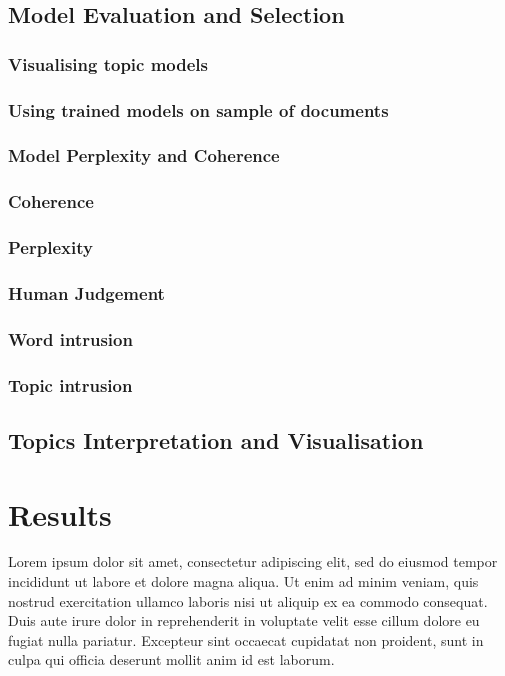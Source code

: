 \documentclass[twoside,11pt,a4paper]{article}
\begin{document}
\clearpage
\subsection{Model Evaluation and Selection}

\subsubsection{Visualising topic models}

\subsubsection{Using trained models on sample of documents}

\subsubsection{Model Perplexity and Coherence}

\subsubsection{Coherence}

\subsubsection{Perplexity}

\subsubsection{Human Judgement}

\subsubsection{Word intrusion}

\subsubsection{Topic intrusion}



\clearpage
\subsection{Topics Interpretation and Visualisation}

\clearpage
\section{Results}
Lorem ipsum dolor sit amet, consectetur adipiscing elit, sed do eiusmod tempor incididunt ut labore et dolore magna aliqua. Ut enim ad minim veniam, quis nostrud exercitation ullamco laboris nisi ut aliquip ex ea commodo consequat. Duis aute irure dolor in reprehenderit in voluptate velit esse cillum dolore eu fugiat nulla pariatur. Excepteur sint occaecat cupidatat non proident, sunt in culpa qui officia deserunt mollit anim id est laborum.\\
\end{document}
